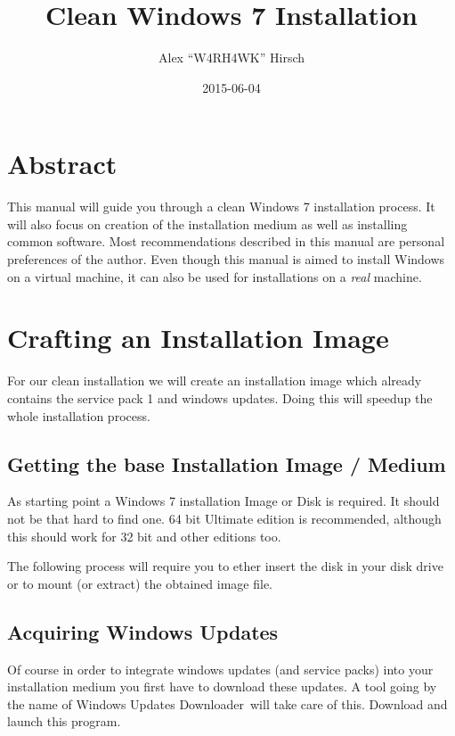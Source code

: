 \documentclass{itsarticle}
\title{Clean Windows 7 Installation}
\author{Alex ``W4RH4WK'' Hirsch}
\date{2015-06-04}
\begin{document}
\maketitle

\section*{Abstract}
\label{sec:abstract}

This manual will guide you through a clean Windows 7 installation process. It
will also focus on creation of the installation medium as well as installing
common software. Most recommendations described in this manual are personal
preferences of the author. Even though this manual is aimed to install Windows
on a virtual machine, it can also be used for installations on a \emph{real}
machine.

\section{Crafting an Installation Image}
\label{sec:install_image}

For our clean installation we will create an installation image which already
contains the service pack 1 and windows updates. Doing this will speedup the
whole installation process.

\subsection{Getting the base Installation Image / Medium}
\label{sub:win7_base_iso}

As starting point a Windows 7 installation Image or Disk is required. It
should not be that hard to find one. 64 bit Ultimate edition is recommended,
although this should work for 32 bit and other editions too.

The following process will require you to ether insert the disk in your disk
drive or to mount (or extract) the obtained image file.

\subsection{Acquiring Windows Updates}
\label{sub:get_win7_updates}

Of course in order to integrate windows updates (and service packs) into your
installation medium you first have to download these updates. A tool going by
the name of Windows Updates Downloader\footnotemark\ will take care of this.
Download and launch this program.
\end{document}
